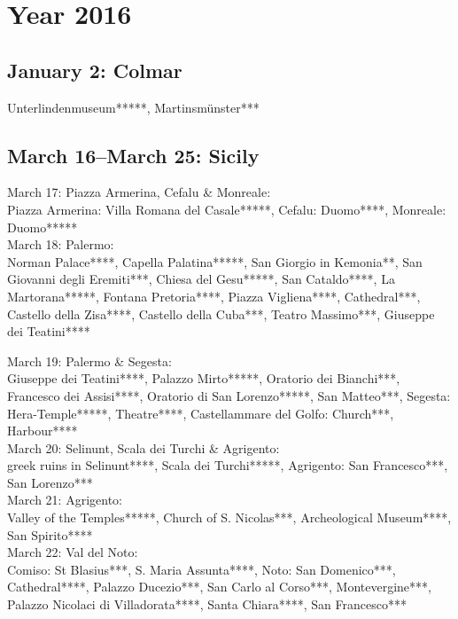 \chapter{Year 2016}
\label{2016}

\section{January 2: Colmar}
\label{Colmar2016}

Unterlindenmuseum*****, Martinsm\"unster***

\section{March 16--March 25: Sicily}
\label{Sicily2016}

March 17: Piazza Armerina, Cefalu \& Monreale:\\
Piazza Armerina: Villa Romana del Casale*****, Cefalu: Duomo****, Monreale: Duomo*****\\

March 18: Palermo:\\
Norman Palace****, Capella Palatina*****, San Giorgio in Kemonia**, San Giovanni degli Eremiti***, Chiesa del Gesu*****, San Cataldo****, La Martorana*****, Fontana Pretoria****, Piazza Vigliena****, Cathedral***, Castello della Zisa****, Castello della Cuba***, Teatro Massimo***, Giuseppe dei Teatini****

March 19: Palermo \& Segesta:\\
Giuseppe dei Teatini****, Palazzo Mirto*****, Oratorio dei Bianchi***, Francesco dei Assisi****, Oratorio di San Lorenzo*****, San Matteo***, Segesta: Hera-Temple*****, Theatre****, Castellammare del Golfo: Church***, Harbour****\\

March 20: Selinunt, Scala dei Turchi \& Agrigento:\\
greek ruins in Selinunt****, Scala dei Turchi*****, Agrigento: San Francesco***, San Lorenzo***\\

March 21: Agrigento:\\
Valley of the Temples*****, Church of S. Nicolas***, Archeological Museum****, San Spirito****\\

March 22: Val del Noto:\\
Comiso: St Blasius***, S. Maria Assunta****, Noto: San Domenico***, Cathedral****, Palazzo Ducezio***, San Carlo al Corso***, Montevergine***, Palazzo Nicolaci di Villadorata****, Santa Chiara****, San Francesco***\\

